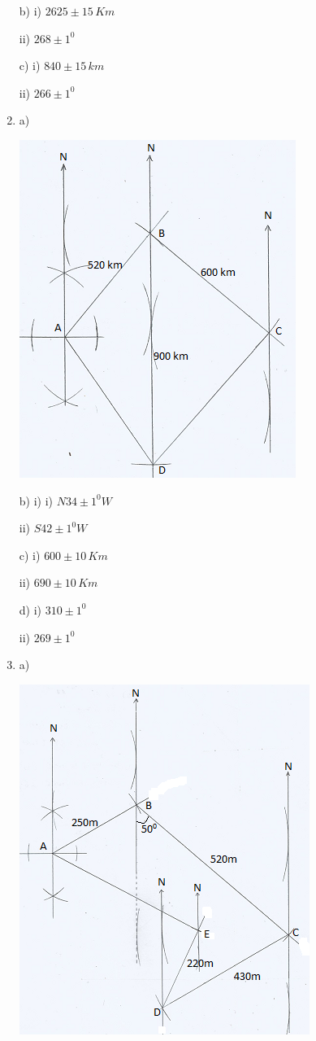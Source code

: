 \documentclass[
  a4paperpaper,
]{scrbook}
\begin{document}
\begin{tcolorbox}
\begin{enumerate}
  b) i) \(2625\pm15\,Km\)

  ii) \(268\pm1^0\)

  c) i) \(840\pm 15\,km\)

  ii) \(266\pm1^0\)
\item
  a)

  \includegraphics{figures/8Q.png}

  b) i) i) \(N34\pm1^0W\)

  ii) \(S42\pm1^0W\)

  c) i) \(600\pm10\,Km\)

  ii) \(690\pm10\,Km\)

  d) i) \(310\pm1^0\)

  ii) \(269\pm1^0\)
\item
  a)

  \includegraphics{figures/9Q.png}


\end{enumerate}
\end{tcolorbox}
\end{document}
